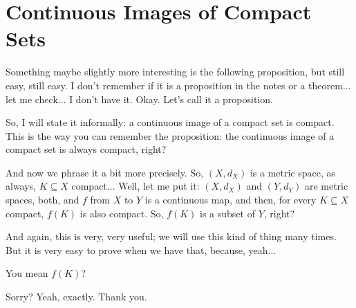 \begin{hidden}
\end{hidden}

\section{Continuous Images of Compact Sets}

\begin{speech}[00:27:13 - 00:29:41]
Something maybe slightly more interesting is the following proposition, but still easy, still easy. I don't remember if it is a proposition in the notes or a theorem... let me check...  I don't have it. Okay. Let's call it a proposition.

So, I will state it informally: a continuous image of a compact set is compact.  This is the way you can remember the proposition: the continuous image of a compact set is always compact, right?

And now we phrase it a bit more precisely. So, $(X, d_X)$ is a metric space, as always,  $K \subseteq X$ compact...  Well, let me put it: $(X, d_X)$ and $(Y, d_Y)$ are metric spaces, both,  and $f$ from $X$ to $Y$ is a continuous map,  and then, for every $K \subseteq X$ compact,  $f(K)$ is also compact.  So, $f(K)$ is a subset of $Y$, right? 

And again, this is very, very useful; we will use this kind of thing many times. But it is very easy to prove when we have that, because, yeah...
\end{speech}

\begin{student}
You mean $f(K)$?
\end{student}

\begin{speech}[00:29:43 - 00:29:48]
Sorry? Yeah, exactly.  Thank you.
\end{speech}

